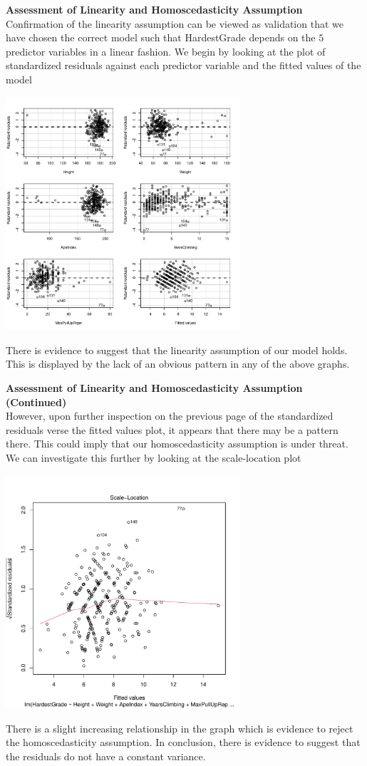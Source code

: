 \documentclass[11pt]{amsart}
\begin{document}
\newpage
{\bf Assessment of Linearity and Homoscedasticity Assumption}\\
Confirmation of the linearity assumption can be viewed as validation that we have chosen the correct model such that HardestGrade depends on the $5$ predictor variables in a linear fashion. We begin by looking at the plot of standardized residuals against each predictor variable and the fitted values of the model
\begin{center}
\includegraphics[width=0.65\textwidth]{3.pdf}
\end{center}
There is evidence to suggest that the linearity assumption of our model holds.
This is displayed by the lack of an obvious pattern in any of the above graphs.

\newpage
{\bf Assessment of Linearity and Homoscedasticity Assumption (Continued) }\\
However, upon further inspection on the previous page of the standardized residuals verse the fitted values plot, it appears that there may be a pattern there.
This could imply that our homoscedasticity assumption is under threat.
We can investigate this further by looking at the scale-location plot
\begin{center}
\includegraphics[width=0.65\textwidth]{4.pdf}
\end{center}
There is a slight increasing relationship in the graph which is evidence to reject the homoscedasticity assumption.
In conclusion, there is evidence to suggest that the residuals do not have a constant variance.
\end{document}
